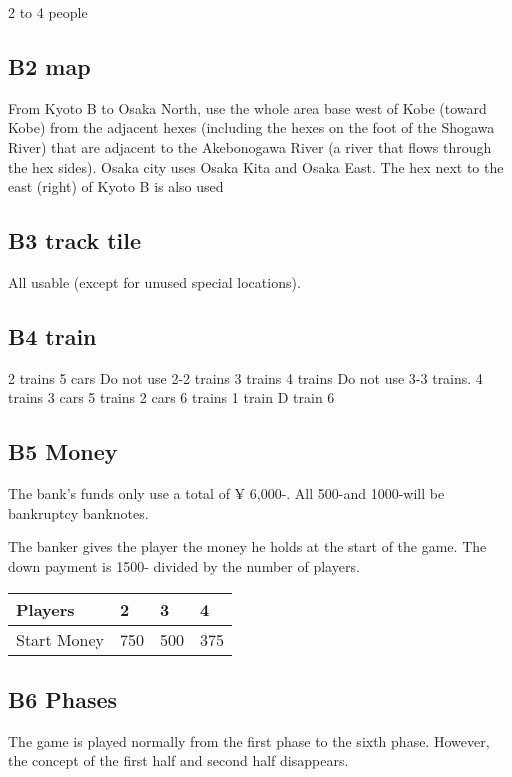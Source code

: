 \documentclass{article}
\begin{document}
\begin{CJK}{UTF8}{min}
2 to 4 people

\subsection*{B2 map}

From Kyoto B to Osaka North, use the whole area base west of Kobe
(toward Kobe) from the adjacent hexes (including the hexes on the foot
of the Shogawa River) that are adjacent to the Akebonogawa River (a
river that flows through the hex sides). Osaka city uses Osaka Kita
and Osaka East. The hex next to the east (right) of Kyoto B is also
used

\subsection*{B3 track tile}

All usable (except for unused special locations).

\subsection*{B4 train}

2 trains 5 cars
Do not use 2-2 trains
3 trains 4 trains
Do not use 3-3 trains.
4 trains 3 cars
5 trains 2 cars
6 trains 1 train
D train 6

\subsection*{B5 Money}

The bank's funds only use a total of ¥ 6,000-. All 500-and 1000-will
be bankruptcy banknotes.

The banker gives the player the money he holds at the start of the
game. The down payment is 1500- divided by the number of players.

\begin{tabular}{|l|l|l|l|}
\hline
Players & 2 & 3 & 4\\
\hline
Start Money & 750 & 500 & 375\\
\hline
\end{tabular}

\subsection*{B6 Phases}

The game is played normally from the first phase to the sixth
phase. However, the concept of the first half and second half
disappears.


\end{CJK}
\end{document}
